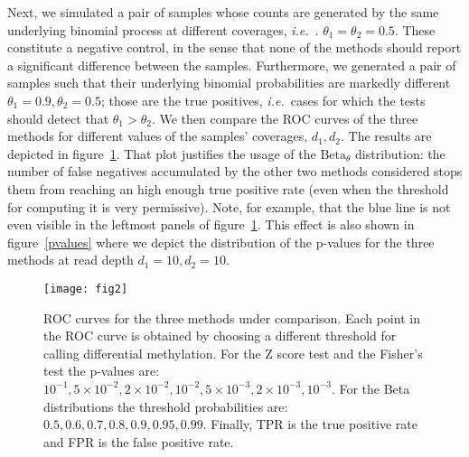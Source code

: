\documentclass[11pt]{amsart}
\newcommand{\ie}{\textit{i.e.}\ }
\newcommand{\betapdf}{\mbox{Beta}_\theta}
\newcommand{\e}[1]{\times 10^{#1}}
\begin{document}
Next, we simulated a pair of samples whose counts are generated by the same underlying binomial process at different coverages, \ie. $\theta_1=\theta_2=0.5$. These constitute a negative control, in the sense that none of the  methods should report a significant difference between the samples. Furthermore, we generated a pair of samples such that their underlying binomial probabilities are markedly different $\theta_1=0.9,\theta_2=0.5$; those are the true positives, \ie cases for which the tests should detect that $\theta_1>\theta_2$. We then compare the ROC curves of the three methods for different values of the samples' coverages, $d_1,d_2$. 
The results are depicted in figure~\ref{roc}. That plot justifies the usage of the $\betapdf$ distribution: the number of false negatives accumulated by the other two methods considered stops them from reaching an high enough true positive rate (even when the threshold for computing it is very permissive). Note, for example, that the blue line is not even visible in the leftmost panels of figure~\ref{roc}. This effect is also shown in figure~\ref{pvalues} where we depict the distribution of the p-values for the three methods at read depth $d_1=10,d_2=10$. 

\begin{figure}[h]
\caption{ROC curves for the three methods under comparison. Each point in the ROC curve is obtained by choosing a different threshold for calling differential methylation. For the Z score test and the Fisher's test the p-values are: $10^{-1}, 5\e{-2}, 2\e{-2}, 10^{-2}, 5\e{-3}, 2\e{-3}, 10^{-3}$. For the Beta distributions the threshold probabilities are: $0.5, 0.6, 0.7, 0.8, 0.9, 0.95, 0.99$. Finally, TPR is the true positive rate and FPR is the false positive rate.}
\texttt{[image: fig2]}
\label{roc}
\end{figure}
\end{document}
